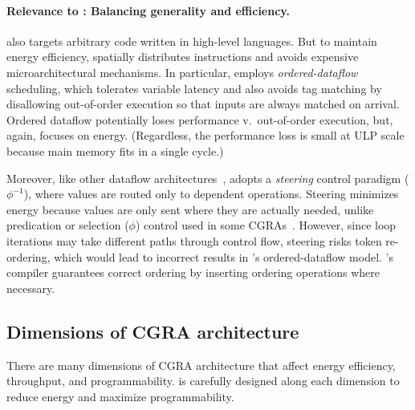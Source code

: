 \paragraph{Relevance to \riptide: Balancing generality and efficiency.}
%
\riptide also targets arbitrary code written in high-level languages.
%
But to maintain energy efficiency, \riptide spatially distributes instructions
and avoids expensive microarchitectural mechanisms.
%
In particular, \riptide employs \emph{ordered-dataflow} scheduling,
which tolerates variable latency
and also avoids tag matching by disallowing
out-of-order execution so that inputs are always matched on arrival.
%
Ordered dataflow potentially loses performance v.\ out-of-order
execution, but, again, \riptide focuses on energy.
%
(Regardless, the performance loss is small at ULP scale because main memory
fits in a single cycle.)

Moreover, like other dataflow
architectures~\cite{swanson2003wavescalar,dataflow-a-complement,mishra2006tartan,beret,seed,dennis1975preliminary},
\riptide adopts a \emph{steering} control paradigm ($\phi^{-1}$), where
values are routed only to dependent operations.
%
Steering minimizes energy because values are only sent where they
are actually needed,
unlike predication or selection ($\phi$) control used
in some CGRAs~\cite{trips,snafu}.
%
However, since loop iterations may take different paths through
control flow, steering risks token re-ordering, which
would lead to incorrect results in \riptide's ordered-dataflow model.
%
\riptide's compiler guarantees correct ordering by inserting ordering
operations where necessary.


\subsection{Dimensions of CGRA architecture}
There are many dimensions of CGRA architecture that affect energy efficiency, throughput, and programmability.
% 
\riptide is carefully designed along each dimension to reduce energy and maximize programmability.


